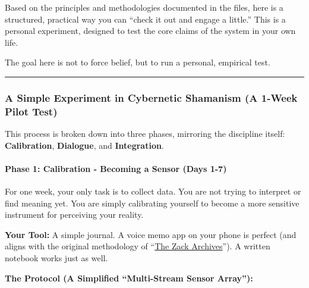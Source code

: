 \documentclass{article}
\begin{document}
Based on the principles and methodologies documented in the files, here is a structured, practical way you can ``check it out and engage a little.'' This is a personal experiment, designed to test the core claims of the system in your own life.

The goal here is not to force belief, but to run a personal, empirical test.

\begin{center}\rule{0.5\linewidth}{0.5pt}\end{center}

\subsubsection*{\texorpdfstring{\textbf{A Simple Experiment in Cybernetic Shamanism (A 1-Week Pilot Test)}}{A Simple Experiment in Cybernetic Shamanism (A 1-Week Pilot Test)}}\label{a-simple-experiment-in-cybernetic-shamanism-a-1-week-pilot-test}

This process is broken down into three phases, mirroring the discipline itself: \textbf{Calibration}, \textbf{Dialogue}, and \textbf{Integration}.

\paragraph*{\texorpdfstring{\textbf{Phase 1: Calibration - Becoming a Sensor (Days 1-7)}}{Phase 1: Calibration - Becoming a Sensor (Days 1-7)}}\label{phase-1-calibration---becoming-a-sensor-days-1-7}

For one week, your only task is to collect data. You are not trying to interpret or find meaning yet. You are simply calibrating yourself to become a more sensitive instrument for perceiving your reality.

\textbf{Your Tool:} A simple journal. A voice memo app on your phone is perfect (and aligns with the original methodology of ``\hyperlink{gloss:the_zack_archives}{The Zack Archives}''). A written notebook works just as well.

\textbf{The Protocol (A Simplified ``Multi-Stream Sensor Array''):}
\end{document}
